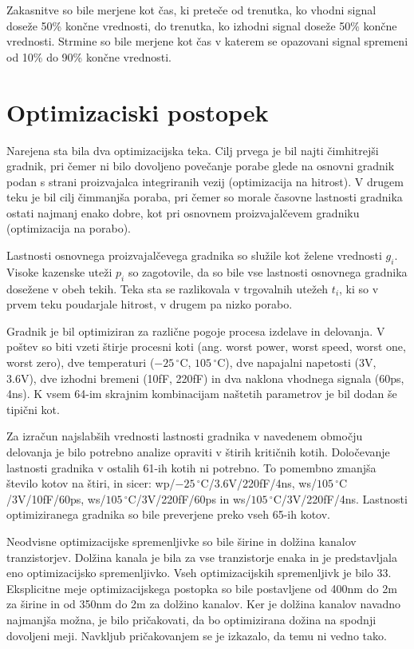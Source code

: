 \documentclass[journal,a4paper,twoside]{sty/IEEEtran}
\begin{document}
Zakasnitve so bile merjene kot čas, ki preteče od trenutka, ko vhodni signal doseže 50\% končne vrednosti, do trenutka, ko izhodni signal doseže 50\% končne vrednosti. Strmine so bile merjene kot čas v katerem se opazovani signal spremeni od 10\% do 90\% končne vrednosti.

\section{Optimizaciski postopek}
Narejena sta bila dva optimizacijska teka. Cilj prvega je bil najti čimhitrejši gradnik, pri čemer ni bilo dovoljeno povečanje porabe glede na osnovni gradnik podan s strani proizvajalca integriranih vezij (optimizacija na hitrost). V drugem teku je bil cilj čimmanjša poraba, pri čemer so morale časovne lastnosti gradnika ostati najmanj enako dobre, kot pri osnovnem proizvajalčevem gradniku (optimizacija na porabo).

Lastnosti osnovnega proizvajalčevega gradnika so služile kot želene vrednosti $g_i$. Visoke kazenske uteži $p_i$ so zagotovile, da so bile vse lastnosti osnovnega gradnika dosežene v obeh tekih. Teka sta se razlikovala v trgovalnih utežeh $t_i$, ki so v prvem teku poudarjale hitrost, v drugem pa nizko porabo.

Gradnik je bil optimiziran za različne pogoje procesa izdelave in delovanja. V poštev so biti vzeti štirje procesni koti (ang. worst power, worst speed, worst one, worst zero), dve temperaturi ($-25\,^{\circ}\mathrm{C}$, $105\,^{\circ}\mathrm{C}$), dve napajalni napetosti (3V, 3.6V), dve izhodni bremeni (10fF, 220fF) in dva naklona vhodnega signala (60ps, 4ns). K vsem 64-im skrajnim kombinacijam naštetih parametrov je bil dodan še tipični kot.

Za izračun najslabših vrednosti lastnosti gradnika v navedenem območju delovanja je bilo potrebno analize opraviti v štirih kritičnih kotih. Določevanje lastnosti gradnika v ostalih 61-ih kotih ni potrebno. To pomembno zmanjša število kotov na štiri, in sicer: wp/$-25\,^{\circ}\mathrm{C}$/3.6V/220fF/4ns, ws/$105\,^{\circ}\mathrm{C}$/3V/10fF/60ps, ws/$105\,^{\circ}\mathrm{C}$/3V/220fF/60ps in ws/$105\,^{\circ}\mathrm{C}$/3V/220fF/4ns. Lastnosti optimiziranega gradnika so bile preverjene preko vseh 65-ih kotov.

Neodvisne optimizacijske spremenljivke so bile širine in dolžina kanalov tranzistorjev. Dolžina kanala je bila za vse tranzistorje enaka in je predstavljala eno optimizacijsko spremenljivko. Vseh optimizacijskih spremenljivk je bilo 33. Eksplicitne meje optimizacijskega postopka so bile postavljene od 400nm do 2\textmu m za širine in od 350nm do 2\textmu m za dolžino kanalov. Ker je dolžina kanalov navadno najmanjša možna, je bilo pričakovati, da bo optimizirana dožina na spodnji dovoljeni meji. Navkljub pričakovanjem se je izkazalo, da temu ni vedno tako.
\end{document}
